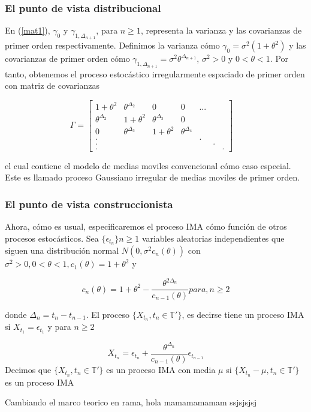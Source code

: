 \subsubsection{El punto de vista distribucional}
En (\ref{mat1}), $\gamma_0$ y $\gamma_{1,\Delta_{n+1}}$, para $n\geq1$, representa la varianza y las covarianzas 
de primer orden respectivamente. Definimos la varianza cómo $\gamma_0=\sigma^2(1+\theta^2)$ y las covarianzas de 
primer orden cómo $\gamma_{1,\Delta_{n+1}}=\sigma^2 \theta^{\Delta_{n+1}}$, $\sigma^2 >0$ y $0<\theta <1$. 
Por tanto, obtenemos el proceso estocástico irregularmente espaciado de primer orden con matriz de covarianzas

\begin{equation}
    \Gamma=
	\begin{bmatrix} 
	1+\theta^2 & \theta^{\Delta_2} & 0 & 0 & ... \\
	\theta^{\Delta_2} & 1+\theta^2 & \theta^{\Delta_3}& 0\\
	0 & \theta^{\Delta_3} & 1+\theta^2 & \theta^{\Delta_4} \\
	.& & & & . \\
	.& & & & & .\\
	. & & & & & & .
	\end{bmatrix}
	\quad
	\label{mat2}
\end{equation}

el cual contiene el modelo de medias moviles convencional cómo caso especial. Este es llamado proceso Gaussiano 
irregular de medias moviles de primer orden.

\subsubsection{El punto de vista construccionista}
Ahora, cómo es usual, especificaremos el proceso IMA cómo función de otros procesos estocásticos. 
Sea $\lbrace \epsilon_{t_n}\rbrace n\geq 1$ variables aleatorias independientes que siguen una distribución 
normal $N(0,\sigma^2 c_n(\theta))$ con $\sigma^2 >0, 0<\theta<1, c_1(\theta)=1+\theta^2$ y

$$
c_n(\theta)=1+\theta^2-\frac{\theta^{2\Delta_n}}{c_{n-1}(\theta)} para, n\geq 2
$$

donde $\Delta_n=t_n-t_{n-1}$. El proceso $\lbrace X_{t_n},t_n \in \mathbb{T'} \rbrace$, es decirse tiene un proceso 
IMA si $X_{t_1}=\epsilon_{t_1}$ y para $n\geq 2 $

\begin{equation}
    X_{t_n}= \epsilon_{t_n}+\frac{\theta^{\Delta_n}}{c_{n-1}(\theta)}\epsilon_{t_{n-1}}
\end{equation}
Decimos que $\lbrace X_{t_n},t_n \in \mathbb{T'} \rbrace$ es un proceso IMA con media 
$\mu$ si $\lbrace X_{t_n}-\mu,t_n \in \mathbb{T'} \rbrace$ es un proceso IMA


Cambiando el marco teorico en rama, hola mamamamamam
ssjsjsjsj